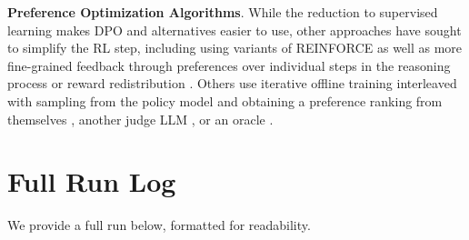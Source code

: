 \documentclass{article}
\theoremstyle{plain}
\theoremstyle{definition}
\theoremstyle{remark}
\begin{document}
\textbf{Preference Optimization Algorithms}. %
While the reduction to supervised learning makes DPO and alternatives easier to use, other approaches have sought to simplify the RL step, including using variants of REINFORCE \citep{ahmadian2024back,team2024gemma} as well as more fine-grained feedback
\citep{wu2024fine} through preferences over individual steps in the reasoning process \citep{uesato2022solving,lightman2023let} or reward redistribution \citep{chan2024dense}. Others use iterative offline training interleaved with sampling from the policy model and obtaining a preference ranking from themselves \citep{xu2023some}, another judge LLM \citep{guo2024direct}, or an oracle \citep{swamy2024minimaximalist}. 


\section{Full Run Log}

We provide a full run below, formatted for readability.
\end{document}
